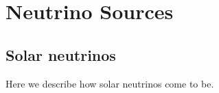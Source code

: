 \section{Neutrino Sources}

\subsection{Solar neutrinos}
\label{sec:solar-nu}

Here we describe how solar neutrinos come to be.